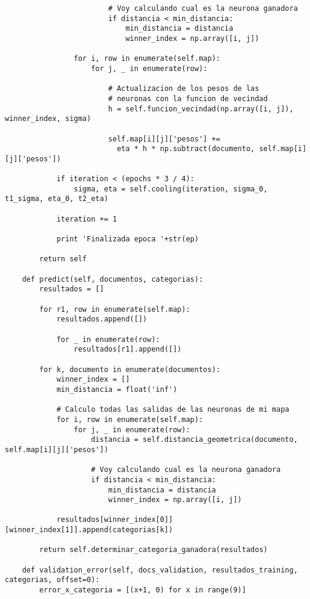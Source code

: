 \begin{changemargin}{-2.0cm}{-1.5cm}
\begin{verbatim}
                        # Voy calculando cual es la neurona ganadora
                        if distancia < min_distancia:
                            min_distancia = distancia
                            winner_index = np.array([i, j])
            
                for i, row in enumerate(self.map):
                    for j, _ in enumerate(row):

                        # Actualizacion de los pesos de las
                        # neuronas con la funcion de vecindad
                        h = self.funcion_vecindad(np.array([i, j]), winner_index, sigma)

                        self.map[i][j]['pesos'] += 
                          eta * h * np.subtract(documento, self.map[i][j]['pesos'])
            
            if iteration < (epochs * 3 / 4):
                sigma, eta = self.cooling(iteration, sigma_0, t1_sigma, eta_0, t2_eta)
            
            iteration += 1

            print 'Finalizada epoca '+str(ep)

        return self

    def predict(self, documentos, categorias):
        resultados = []

        for r1, row in enumerate(self.map):
            resultados.append([])

            for _ in enumerate(row):
                resultados[r1].append([])

        for k, documento in enumerate(documentos):
            winner_index = []
            min_distancia = float('inf')

            # Calculo todas las salidas de las neuronas de mi mapa
            for i, row in enumerate(self.map):
                for j, _ in enumerate(row):
                    distancia = self.distancia_geometrica(documento, self.map[i][j]['pesos'])

                    # Voy calculando cual es la neurona ganadora
                    if distancia < min_distancia:
                        min_distancia = distancia
                        winner_index = np.array([i, j])

            resultados[winner_index[0]][winner_index[1]].append(categorias[k])

        return self.determinar_categoria_ganadora(resultados)

    def validation_error(self, docs_validation, resultados_training, categorias, offset=0):
        error_x_categoria = [(x+1, 0) for x in range(9)]


\end{verbatim}
\end{changemargin}
